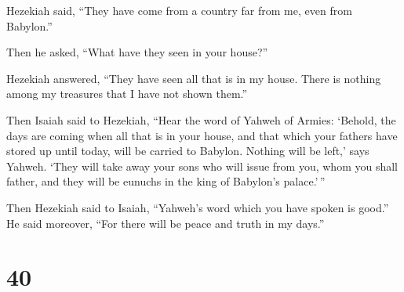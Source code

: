 Hezekiah said, ``They have come from a country far from me, even from
Babylon.''

 Then he asked, ``What have they seen in your house?''

Hezekiah answered, ``They have seen all that is in my house. There is
nothing among my treasures that I have not shown them.''

 Then Isaiah said to Hezekiah, ``Hear the word of Yahweh of
Armies:  `Behold, the days are coming when all that is in
your house, and that which your fathers have stored up until today, will
be carried to Babylon. Nothing will be left,' says Yahweh. 
`They will take away your sons who will issue from you, whom you shall
father, and they will be eunuchs in the king of Babylon's palace.'\,''

 Then Hezekiah said to Isaiah, ``Yahweh's word which you
have spoken is good.'' He said moreover, ``For there will be peace and
truth in my days.''

\hypertarget{section-38}{%
\section{40}\label{section-38}}


